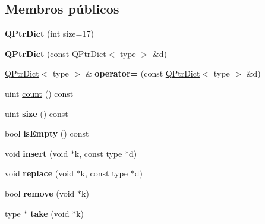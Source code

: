 \subsection*{Membros públicos}
\begin{DoxyCompactItemize}
\item 
\hypertarget{class_q_ptr_dict_acbfa1133243599104da19b2b8b99b6b1}{{\bfseries Q\-Ptr\-Dict} (int size=17)}\label{class_q_ptr_dict_acbfa1133243599104da19b2b8b99b6b1}

\item 
\hypertarget{class_q_ptr_dict_a79156110e00d5a3b164bd716c3ab0ca1}{{\bfseries Q\-Ptr\-Dict} (const \hyperlink{class_q_ptr_dict}{Q\-Ptr\-Dict}$<$ type $>$ \&d)}\label{class_q_ptr_dict_a79156110e00d5a3b164bd716c3ab0ca1}

\item 
\hypertarget{class_q_ptr_dict_a542decf9371d9e9d08f10c1e50f1ef32}{\hyperlink{class_q_ptr_dict}{Q\-Ptr\-Dict}$<$ type $>$ \& {\bfseries operator=} (const \hyperlink{class_q_ptr_dict}{Q\-Ptr\-Dict}$<$ type $>$ \&d)}\label{class_q_ptr_dict_a542decf9371d9e9d08f10c1e50f1ef32}

\item 
uint \hyperlink{class_q_ptr_dict_a774149fc271ebaba2aabcd183a836e8f}{count} () const 
\item 
\hypertarget{class_q_ptr_dict_a7e63723212bed1ca52f0fe57e58b812e}{uint {\bfseries size} () const }\label{class_q_ptr_dict_a7e63723212bed1ca52f0fe57e58b812e}

\item 
\hypertarget{class_q_ptr_dict_a479432127ee77145cc19d6a2d1590821}{bool {\bfseries is\-Empty} () const }\label{class_q_ptr_dict_a479432127ee77145cc19d6a2d1590821}

\item 
\hypertarget{class_q_ptr_dict_a33b65c1a9e644ac7c0027effb1df0518}{void {\bfseries insert} (void $\ast$k, const type $\ast$d)}\label{class_q_ptr_dict_a33b65c1a9e644ac7c0027effb1df0518}

\item 
\hypertarget{class_q_ptr_dict_af86ff6e307b12be58829824e1fa1b9f0}{void {\bfseries replace} (void $\ast$k, const type $\ast$d)}\label{class_q_ptr_dict_af86ff6e307b12be58829824e1fa1b9f0}

\item 
\hypertarget{class_q_ptr_dict_a4192c4de6ea9579e8c5a641a75b63261}{bool {\bfseries remove} (void $\ast$k)}\label{class_q_ptr_dict_a4192c4de6ea9579e8c5a641a75b63261}

\item 
\hypertarget{class_q_ptr_dict_a4751e9b1d43f2e8fe30a740b7dbc8ec9}{type $\ast$ {\bfseries take} (void $\ast$k)}\label{class_q_ptr_dict_a4751e9b1d43f2e8fe30a740b7dbc8ec9}


\end{DoxyCompactItemize}
